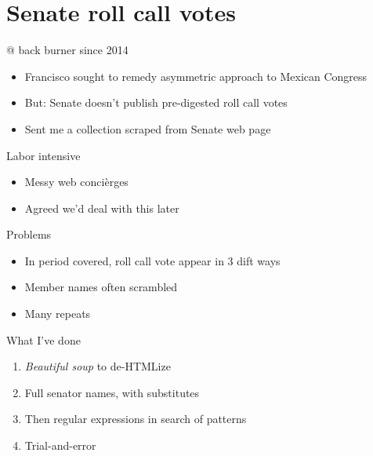 \documentclass[bigger]{beamer}
\begin{document}
\section{Senate roll call votes}
\label{sec:org3619f01}
\begin{frame}[label={sec:org115604a}]{@ back burner since 2014}
\begin{itemize}
\item Francisco sought to remedy asymmetric approach to Mexican Congress
\item But: Senate doesn't publish pre-digested roll call votes
\item Sent me a collection scraped from Senate web page \pause
\end{itemize}
\begin{block}{Labor intensive}
\begin{itemize}
\item Messy web concièrges
\item Agreed we'd deal with this later
\end{itemize}
\end{block}
\end{frame}
\begin{frame}[label={sec:orgae5f13c}]{Problems}
\begin{itemize}
\item In period covered, roll call vote appear in 3 dift ways
\item Member names often scrambled
\item Many repeats  \pause
\end{itemize}
\begin{block}{What I've done}
\begin{enumerate}
\item \emph{Beautiful soup} to de-HTMLize
\item Full senator names, with substitutes
\item Then regular expressions in search of patterns
\item Trial-and-error
\end{enumerate}
\end{block}
\end{frame}
\end{document}
